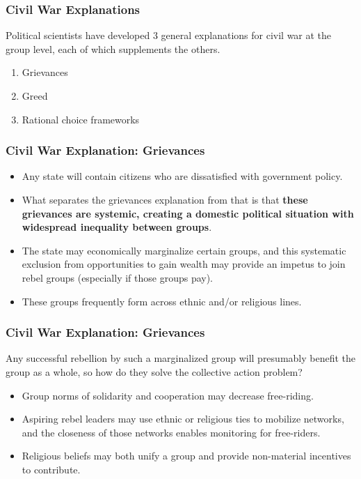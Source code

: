 \documentclass[handout]{beamer}
\begin{document}
\begin{frame} 
\frametitle{\LARGE{Civil War Explanations}}
Political scientists have developed 3 general explanations for civil war at the group level, each of which supplements the others.
\begin{enumerate}
		\item Grievances
		\item Greed
		\item Rational choice frameworks
\end{enumerate}
\end{frame}

\begin{frame} 
	\frametitle{\LARGE{Civil War Explanation: Grievances}}
	\begin{itemize}
		\item Any state will contain citizens who are dissatisfied with government policy. \pause
		\item What separates the grievances explanation from that is that \textbf{these grievances are systemic, creating a domestic political situation with widespread inequality between groups}. \pause
		\item The state may economically marginalize certain groups, and this systematic exclusion from opportunities to gain wealth may provide an impetus to join rebel groups (especially if those groups pay). \pause
		\item These groups frequently form across ethnic and/or religious lines.
	\end{itemize}
\end{frame}

\begin{frame} 
	\frametitle{\LARGE{Civil War Explanation: Grievances}}
Any successful rebellion by such a marginalized group will presumably benefit the group as a whole, so how do they solve the collective action problem?
	\begin{itemize}
		\item Group norms of solidarity and cooperation may decrease free-riding. \pause
		\item Aspiring rebel leaders may use ethnic or religious ties to mobilize networks, and the closeness of those networks enables monitoring for free-riders. \pause
		\item Religious beliefs may both unify a group and provide non-material incentives to contribute.
	\end{itemize}
\end{frame}
\end{document}
